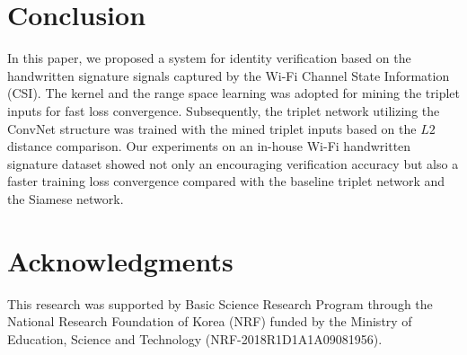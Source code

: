 \documentclass{sig-alternate-05-2015}
\begin{document}
\section{Conclusion}
In this paper, we proposed a system for identity verification based on the handwritten signature signals captured by the Wi-Fi Channel State Information (CSI). 
The kernel and the range space learning was adopted for mining the triplet inputs for fast loss convergence. 
Subsequently, the triplet network utilizing the ConvNet structure was trained with the mined triplet inputs based on the $L2$ distance comparison. 
Our experiments on an in-house Wi-Fi handwritten signature dataset showed not only an encouraging verification accuracy but also a faster training loss convergence compared with the baseline triplet network and the Siamese network.

\section{Acknowledgments}
This research was supported by Basic Science Research
Program through the National Research Foundation of Korea
(NRF) funded by the Ministry of Education, Science and
Technology (NRF-2018R1D1A1A09081956).


%
%

%
%
\end{document}
